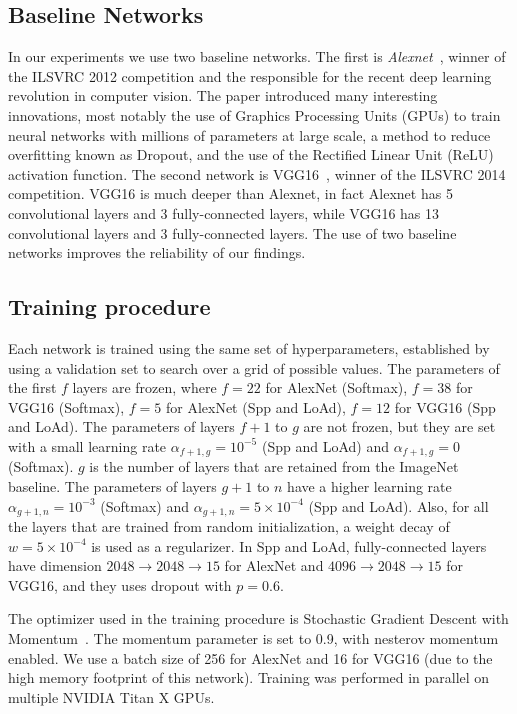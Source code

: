 \documentclass[../main.tex]{subfiles}
\begin{document}
    \subsection{Baseline Networks}\label{subsec:networks}
    In our experiments we use two baseline networks. The first is \textit{Alexnet}~\cite{alexnet}, winner of the ILSVRC 2012 competition
    and the responsible for the recent deep learning revolution in computer vision. The paper introduced many interesting innovations, most
    notably the use of Graphics Processing Units (GPUs) to train neural networks with millions of parameters at large scale, a method
    to reduce overfitting known as Dropout, and the use of the Rectified Linear Unit (ReLU) activation function.
    The second network is VGG16~\cite{vgg16}, winner of the ILSVRC 2014 competition.
    VGG16 is much deeper than Alexnet, in fact Alexnet has 5 convolutional layers and 3 fully-connected layers, while VGG16 has 13
    convolutional layers and 3 fully-connected layers. The use of two baseline networks improves the reliability of our findings.

    \subsection{Training procedure}
    Each network is trained using the same set of hyperparameters, established by using a validation set to search over a grid of
    possible values.
    The parameters of the first $f$ layers are frozen, where $f = 22$ for AlexNet (Softmax), $f = 38$ for VGG16 (Softmax),
    $f = 5$ for AlexNet (Spp and LoAd), $f = 12$ for VGG16 (Spp and LoAd).
    The parameters of layers $f + 1$ to $g$ are not frozen, but they are set with a small learning rate $\alpha_{f+1,g} = 10^{-5}$ (Spp and LoAd)
    and $\alpha_{f+1,g} = 0$ (Softmax). $g$ is the number of layers that are retained from the ImageNet baseline.
    The parameters of layers $g + 1$ to $n$ have a higher learning rate $\alpha_{g+1,n} = 10^{-3}$ (Softmax) and $\alpha_{g+1,n} = 5 \times 10^{-4}$
    (Spp and LoAd). Also, for all the layers that are trained from random initialization, a weight decay of $w = 5 \times 10^{-4}$ is used as a regularizer.
    In Spp and LoAd, fully-connected layers have dimension $2048 \rightarrow 2048 \rightarrow 15 $ for AlexNet and $4096 \rightarrow 2048
    \rightarrow 15 $ for VGG16, and they uses dropout with $p = 0.6$.

    The optimizer used in the training procedure is Stochastic Gradient Descent with Momentum~\cite{momentum}. The momentum parameter
    is set to 0.9, with nesterov momentum~\cite{nesterov-momentum} enabled.
    We use a batch size of 256 for AlexNet and 16 for VGG16 (due to the high memory footprint of this network).
    Training was performed in parallel on multiple NVIDIA Titan X GPUs.
\end{document}

